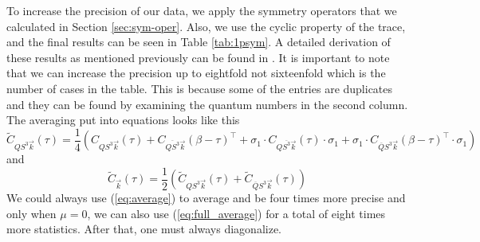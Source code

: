 To increase the precision of our data, we apply the symmetry operators that we calculated in Section \ref{sec:sym-oper}. Also, we use the cyclic property of the trace, and the final results can be seen in Table \ref{tab:1psym}. A detailed derivation of these results as mentioned previously can be found in \cite{evan}. It is important to note that we can increase the precision up to eightfold not sixteenfold which is the number of cases in the table. This is because some of the entries are duplicates and they can be found by examining the quantum numbers in the second column. The averaging put into equations looks like this
\begin{equation}
  \tilde{C}_{QS^3\vec{k}}(\tau) = \frac{1}{4}\left( C_{QS^3\vec{k}}(\tau) + C_{\overline{QS^3}\vec{k}}(\beta-\tau)^\top + \sigma_1\cdot C_{Q\overline{S^3}\vec{k}}(\tau) \cdot\sigma_1 + \sigma_1\cdot C_{\overline{Q}S^3\vec{k}}(\beta-\tau)^\top \cdot\sigma_1 \right)
  \label{eq:average}
\end{equation}
and
\begin{equation}
  \tilde{C}_{\vec{k}}(\tau) = \frac{1}{2}\left( \tilde{C}_{QS^3\vec{k}}(\tau) + \tilde{C}_{\overline{Q}S^3\vec{k}}(\tau) \right)
  \label{eq:full_average}
\end{equation}
We could always use (\ref{eq:average}) to average and be four times more precise and only when $\mu = 0$, we can also use (\ref{eq:full_average}) for a total of eight times more statistics. After that, one must always diagonalize.

